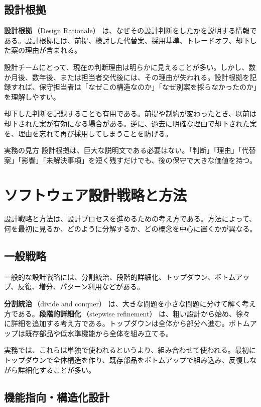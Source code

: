 \documentclass[10.5pt,a4paper]{ltjsarticle}
\newcommand{\term}[2]{\textbf{#1}\,（#2）}
\begin{document}
\subsection{設計根拠}

\term{設計根拠}{Design Rationale} は、なぜその設計判断をしたかを説明する情報である。設計根拠には、前提、検討した代替案、採用基準、トレードオフ、却下した案の理由が含まれる。

設計チームにとって、現在の判断理由は明らかに見えることが多い。しかし、数か月後、数年後、または担当者交代後には、その理由が失われる。設計根拠を記録すれば、保守担当者は「なぜこの構造なのか」「なぜ別案を採らなかったのか」を理解しやすい。

却下した判断を記録することも有用である。前提や制約が変わったとき、以前は却下された案が有効になる場合がある。逆に、過去に明確な理由で却下された案を、理由を忘れて再び採用してしまうことを防げる。

\begin{pointbox}{実務の見方}
設計根拠は、巨大な説明文である必要はない。「判断」「理由」「代替案」「影響」「未解決事項」を短く残すだけでも、後の保守で大きな価値を持つ。
\end{pointbox}

\section{ソフトウェア設計戦略と方法}

設計戦略と方法は、設計プロセスを進めるための考え方である。方法によって、何を最初に見るか、どのように分解するか、どの概念を中心に置くかが異なる。

\subsection{一般戦略}

一般的な設計戦略には、分割統治、段階的詳細化、トップダウン、ボトムアップ、反復、増分、パターン利用などがある。

\term{分割統治}{divide and conquer} は、大きな問題を小さな問題に分けて解く考え方である。\term{段階的詳細化}{stepwise refinement} は、粗い設計から始め、徐々に詳細を追加する考え方である。トップダウンは全体から部分へ進む。ボトムアップは既存部品や低水準機能から全体を組み立てる。

実務では、これらは単独で使われるというより、組み合わせて使われる。最初にトップダウンで全体構造を作り、既存部品をボトムアップで組み込み、反復しながら詳細化することが多い。

\subsection{機能指向・構造化設計}
\end{document}
